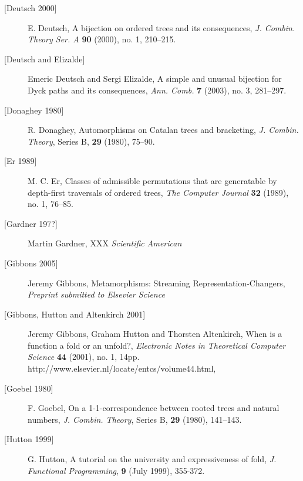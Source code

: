 \documentclass[11pt]{article} %
\begin{document}
\begin{description}
\item[{[Deutsch 2000]}] E. Deutsch, A bijection on ordered trees 
and its consequences, \emph{J. Combin. Theory Ser. A} \textbf{90} (2000), no. 1, 210--215. 

\item[{[Deutsch and Elizalde]}] Emeric Deutsch and Sergi Elizalde,
A simple and unusual bijection for Dyck paths and its consequences,
\emph{Ann. Comb.} \textbf{7} (2003), no. 3, 281--297.  


\item[{[Donaghey 1980]}]
R. Donaghey,
Automorphisms on Catalan trees and bracketing,
{\em J. Combin. Theory}, Series B, {\bf 29} (1980), 75--90.

\item[{[Er 1989]}] M. C. Er, Classes of admissible permutations that are generatable by depth-first traversals of ordered trees,
\emph{The Computer Journal} \textbf{32} (1989), no. 1, 76--85.

\item[{[Gardner 197?]}] Martin Gardner, XXX
\emph{Scientific American}

\item[{[Gibbons 2005]}] Jeremy Gibbons, Metamorphisms: Streaming Representation-Changers,
\emph{Preprint submitted to Elsevier Science}

\item[{[Gibbons, Hutton and Altenkirch 2001]}] Jeremy Gibbons, Graham Hutton and Thorsten Altenkirch, When is a function a fold or an unfold?,
\emph{Electronic Notes in Theoretical Computer Science} \textbf{44} (2001), no. 1, 14pp.
\newline
{}
{http://www.elsevier.nl/locate/entcs/volume44.html},

\item[{[Goebel 1980]}] F. Goebel, On a 1-1-correspondence between rooted trees and natural numbers,
\emph{J. Combin. Theory}, Series B, {\bf 29} (1980), 141--143.

\item[{[Hutton 1999]}] G. Hutton, A tutorial on the university and expressiveness of fold,
\emph{J. Functional Programming}, {\bf 9} (July 1999), 355-372.


\end{description}
\end{document}
